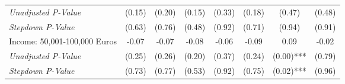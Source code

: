 \begin{tabular}{l c c c c c c c}
\quad \textit{Unadjusted P-Value} & (0.15) & (0.20) & (0.15) & (0.33) & (0.18) & (0.47) & (0.48) \\
\quad \textit{Stepdown P-Value} & (0.63) & (0.76) & (0.48) & (0.92) & (0.71) & (0.94) & (0.91) \\
Income: 50,001-100,000 Euros & -0.07 & -0.07 & -0.08 & -0.06 & -0.09 & 0.09 & -0.02 \\
\quad \textit{Unadjusted P-Value} & (0.25) & (0.26) & (0.20) & (0.37) & (0.24) & (0.00)*** & (0.79) \\
\quad \textit{Stepdown P-Value} & (0.73) & (0.77) & (0.53) & (0.92) & (0.75) & (0.02)*** & (0.96) \\
\bottomrule
\end{tabular}

